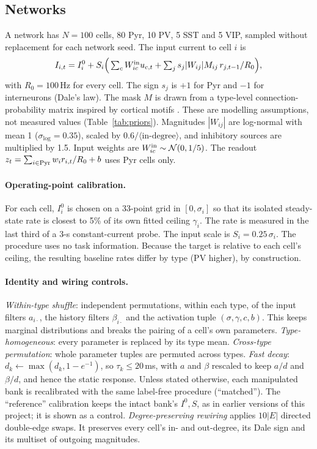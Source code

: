 \subsection{Networks}
A network has $N=100$ cells, 80 Pyr, 10 PV, 5 SST and 5 VIP, sampled without replacement for each
network seed. The input current to cell $i$ is
\begin{equation}
I_{i,t}=I^0_i + S_i\Big(\textstyle\sum_c W^{\rm in}_{ic}u_{c,t}+\sum_j s_j |W_{ij}| M_{ij}\, r_{j,t-1}/R_0\Big),
\end{equation}
with $R_0=100$\,Hz for every cell. The sign $s_j$ is $+1$ for Pyr and $-1$ for interneurons
(Dale's law). The mask $M$ is drawn from a type-level connection-probability matrix inspired by
cortical motifs \citep{pfeffer2013,pi2013}. These are modelling assumptions, not measured values
(Table~\ref{tab:priors}). Magnitudes $|W_{ij}|$ are log-normal with mean 1 ($\sigma_{\log}=0.35$),
scaled by $0.6/\langle\text{in-degree}\rangle$, and inhibitory sources are multiplied by 1.5.
Input weights are $W^{\rm in}_{ic}\sim\mathcal N(0,1/5)$. The readout
$z_t=\sum_{i\in\rm Pyr}w_i r_{i,t}/R_0+b$ uses Pyr cells only.

\paragraph{Operating-point calibration.}
For each cell, $I^0_i$ is chosen on a 33-point grid in $[0,\sigma_i]$ so that its isolated
steady-state rate is closest to 5\% of its own fitted ceiling $\gamma_i$. The rate is measured in
the last third of a 3-s constant-current probe. The input scale is $S_i=0.25\,\sigma_i$. The
procedure uses no task information. Because the target is relative to each cell's ceiling, the
resulting baseline rates differ by type (PV higher), by construction.

\paragraph{Identity and wiring controls.}
\emph{Within-type shuffle}: independent permutations, within each type, of the input filters
$a_{i\cdot}$, the history filters $\beta_{i\cdot}$ and the activation tuple
$(\sigma,\gamma,c,b)$. This keeps marginal distributions and breaks the pairing of a cell's own
parameters. \emph{Type-homogeneous}: every parameter is replaced by its type mean.
\emph{Cross-type permutation}: whole parameter tuples are permuted across types. \emph{Fast
decay}: $d_k\leftarrow\max(d_k,1-e^{-1})$, so $\tau_k\le20$\,ms, with $a$ and $\beta$ rescaled to
keep $a/d$ and $\beta/d$, and hence the static response. Unless stated otherwise, each manipulated
bank is recalibrated with the same label-free procedure (``matched''). The ``reference''
calibration keeps the intact bank's $I^0,S$, as in earlier versions of this project; it is shown as
a control. \emph{Degree-preserving rewiring} applies $10|E|$ directed double-edge swaps. It
preserves every cell's in- and out-degree, its Dale sign and its multiset of outgoing magnitudes.

